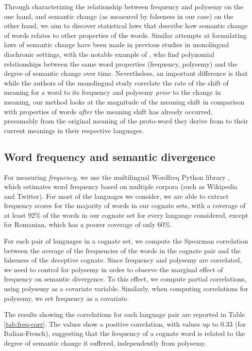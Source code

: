 \documentclass[output=paper]{langsci/langscibook}
\begin{document}
Through characterizing the relationship between frequency and polysemy on the one hand, and semantic change (as measured by falseness in our case) on the other hand, we aim to discover statistical laws that describe how semantic change of words relates to other properties of the words. Similar attempts at formulating laws of semantic change have been made in previous studies in monolingual diachronic settings, with the notable example of \citet{hamilton-etal-2016-diachronic}, who find polynomial relationships between the same word properties (frequency, polysemy) and the degree of semantic change over time. Nevertheless, an important difference is that while the authors of the monolingual study correlate the rate of the shift of meaning for a word to its frequency and polysemy \textit{prior} to the change in meaning, our method looks at the magnitude of the meaning shift in comparison with properties of words \textit{after} the meaning shift has already occurred, presumably from the original meaning of the proto-word they derive from to their current meanings in their respective languages.

\subsection{Word frequency and semantic divergence}

For measuring \textit{frequency}, we use the multilingual Wordfreq Python library \citep{cognatesuban:robyn_speer_2018_1443582}, which estimates word frequency based on multiple corpora (such as Wikipedia and Twitter). 
For most of the languages we consider, we are able to extract frequency scores for the majority of words in our cognate sets, with a coverage of at least 92\% of the words in our cognate set for every language considered, except for Romanian, which has a poorer coverage of only 60\%.


For each pair of languages in a cognate set, we compute the Spearman correlation between the average of the frequencies of the words in the cognate pair and the falseness of the deceptive cognate. Since frequency and polysemy are correlated, we need to control for polysemy in order to observe the marginal effect of frequency on semantic divergence. To this effect, we compute partial correlations, using polysemy as a covariate variable. Similarly, when computing correlations for polysemy, we set frequency as a covariate.

The results showing the correlations for each language pair are reported in Table \ref{tab:freq-corr}. The values show a positive correlation, with values up to $0.33$ (for Italian-French), suggesting that the frequency of a cognate word is related to the degree of semantic change it suffered, independently from polysemy.
\end{document}
